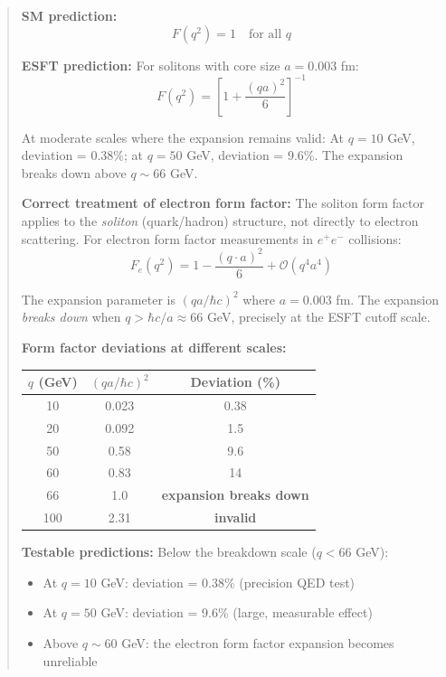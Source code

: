 ﻿\documentclass[twocolumn,prd,amsmath,amssymb,aps]{revtex4-2}
\begin{document}
\begin{abstract}
\textbf{SM prediction:}
\begin{equation}
F(q^2) = 1 \quad \text{for all } q
\end{equation}

\textbf{ESFT prediction:} For solitons with core size $a = 0.003$ fm:
\begin{equation}
F(q^2) = \left[1 + \frac{(qa)^2}{6}\right]^{-1}
\end{equation}

At moderate scales where the expansion remains valid: At $q = 10$ GeV, deviation = 0.38\%; at $q = 50$ GeV, deviation = 9.6\%. The expansion breaks down above $q \sim 66$ GeV.

\textbf{Correct treatment of electron form factor:} The soliton form factor applies to the \emph{soliton} (quark/hadron) structure, not directly to electron scattering. For electron form factor measurements in $e^+e^-$ collisions:
\begin{equation}
F_e(q^2) = 1 - \frac{(q \cdot a)^2}{6} + \mathcal{O}(q^4a^4)
\end{equation}

The expansion parameter is $(qa/\hbar c)^2$ where $a = 0.003$ fm. The expansion \emph{breaks down} when $q > \hbar c/a \approx 66$ GeV, precisely at the ESFT cutoff scale.

\textbf{Form factor deviations at different scales:}
\begin{center}
\begin{tabular}{|c|c|c|}
\hline
$q$ (GeV) & $(qa/\hbar c)^2$ & Deviation (\%) \\
\hline
10 & 0.023 & 0.38 \\
20 & 0.092 & 1.5 \\
50 & 0.58 & 9.6 \\
60 & 0.83 & 14 \\
66 & 1.0 & \textbf{expansion breaks down} \\
100 & 2.31 & \textbf{invalid} \\
\hline
\end{tabular}
\end{center}

\textbf{Testable predictions:} Below the breakdown scale ($q < 66$ GeV):
\begin{itemize}
\item At $q = 10$ GeV: deviation = 0.38\% (precision QED test)
\item At $q = 50$ GeV: deviation = 9.6\% (large, measurable effect)
\item Above $q \sim 60$ GeV: the electron form factor expansion becomes unreliable
\end{itemize}


\end{abstract}
\end{document}
